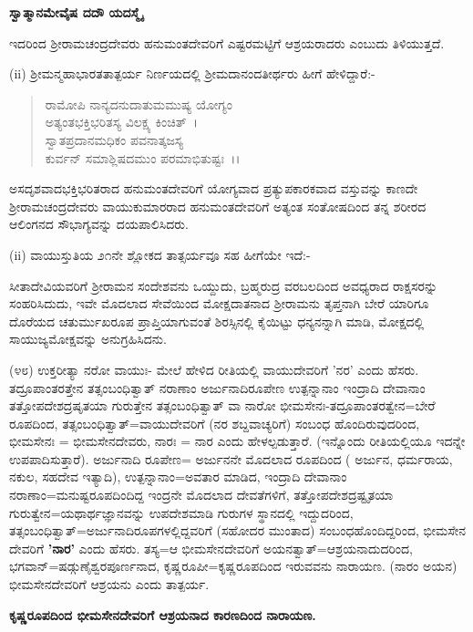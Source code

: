\begin{center}
\textbf{ಸ್ವಾತ್ಮಾನಮೇವೈಷ ದದೌ ಯದಸ್ಮೈ}
\end{center}

\noindent
ಇದರಿಂದ ಶ‍್ರೀರಾಮಚಂದ್ರದೇವರು ಹನುಮಂತದೇವರಿಗೆ ಎಷ್ಟರಮಟ್ಟಿಗೆ ಆಶ್ರಯರಾದರು ಎಂಬುದು ತಿಳಿಯುತ್ತದೆ.

(ii) ಶ‍್ರೀಮನ್ಮಹಾಭಾರತತಾತ್ಪರ್ಯ ನಿರ್ಣಯದಲ್ಲಿ ಶ‍್ರೀಮದಾನಂದತೀರ್ಥರು ಹೀಗೆ ಹೇಳಿದ್ದಾರೆ:-

\begin{verse}
ರಾಮೋಪಿ ನಾನ್ಯದನುದಾತುಮಮುಷ್ಯ ಯೋಗ್ಯಂ\\ ಅತ್ಯಂತಭಕ್ತಿಭರಿತಸ್ಯ ವಿಲಕ್ಷ್ಯ ಕಿಂಚಿತ್~।\\ ಸ್ವಾತಪ್ರದಾನಮಧಿಕಂ ಪವನಾತ್ಕಜಸ್ಯ\\ ಕುರ್ವನ್ ಸಮಾಶ್ಲಿಷದಮುಂ ಪರಮಾಭಿತುಷ್ಟಃ~।।
\end{verse}

\noindent
ಅಸದೃಶವಾದಭಕ್ತಿಭರಿತರಾದ ಹನುಮಂತದೇವರಿಗೆ ಯೋಗ್ಯವಾದ ಪ್ರತ್ಯುಪಕಾರಕವಾದ ವಸ್ತುವನ್ನು ಕಾಣದೇ ಶ‍್ರೀರಾಮಚಂದ್ರದೇವರು ವಾಯುಕುಮಾರರಾದ ಹನುಮಂತದೇವರಿಗೆ ಅತ್ಯಂತ ಸಂತೋಷದಿಂದ ತನ್ನ ಶರೀರದ ಆಲಿಂಗನದ ಸೌಭಾಗ್ಯವನ್ನು ದಯಪಾಲಿಸಿದರು.

(ii) ವಾಯುಸ್ತುತಿಯ ೨೧ನೇ ಶ್ಲೋಕದ ತಾತ್ಸರ್ಯವೂ ಸಹ ಹೀಗೆಯೇ ಇದೆ:-

ಸೀತಾದೇವಿಯವರಿಗೆ ಶ‍್ರೀರಾಮನ ಸಂದೇಶವನು ಒಯ್ದುದು, ಬ್ರಹ್ಮರುದ್ರ ವರಬಲದಿಂದ ಅವಧ್ಯರಾದ ರಾಕ್ಷಸರನ್ನು ಸಂಹರಿಸಿದುದು, ಇವೇ ಮೊದಲಾದ ಸೇವೆಯಿಂದ ಮೋಕ್ಷದಾತನಾದ ಶ‍್ರೀರಾಮನು ತೃಪ್ತನಾಗಿ ಬೇರೆ ಯಾರಿಗೂ ದೊರೆಯದ ಚತುರ್ಮುಖರೂಪ ಪ್ರಾಪ್ತಿಯಾಗುವಂತೆ ಶಿರಸ್ಸಿನಲ್ಲಿ ಕೈಯಿಟ್ಟು ಧನ್ಯನನ್ನಾಗಿ ಮಾಡಿ, ಮೋಕ್ಷದಲ್ಲಿ ಸಾಯುಜ್ಯಮೋಕ್ಷವನ್ನು ಅನುಗ್ರಹಿಸಿದನು.

(೪೮) ಉಕ್ತರೀತ್ಯಾ ನರೋ ವಾಯುಃ- ಮೇಲೆ ಹೇಳಿದ ರೀತಿಯಲ್ಲಿ ವಾಯುದೇವರಿಗೆ 'ನರ' ಎಂದು ಹೆಸರು. ತದ್ರೂಪಾಂತರತ್ತೇನ ತತ್ಸಂಬಂಧಿತ್ವಾತ್ ನರಾಣಾಂ ಅರ್ಜುನಾದಿರೂಪೇಣ ಉತ್ಪನ್ನಾನಾಂ ಇಂದ್ರಾದಿ ದೇವಾನಾಂ ತತ್ತೋಪದೇಶದ್ರಷೃತಯಾ ಗುರುತ್ತೇನ ತತ್ಸಂಬಂಧಿತ್ವಾತ್ ವಾ ನಾರೋ ಭೀಮಸೇನಃ-ತದ್ರೂಪಾಂತರತ್ವೇನ=ಬೇರೆ ರೂಪದಿಂದ, ತತ್ಸಂಬಂಧಿತ್ವಾತ್=ವಾಯುದೇವರಿಗೆ (ನರ ಶಬ್ದವಾಚ್ಯರಿಗೆ) ಸಂಬಂಧ ಹೊಂದಿರುವುದರಿಂದ, ಭೀಮಸೇನಃ = ಭೀಮಸೇನದೇವರು, ನಾರಃ = ನಾರ ಎಂದು ಹೇಳಲ್ಪಡುತ್ತಾರೆ. (ಇನ್ನೊಂದು ರೀತಿಯಲ್ಲಿಯೂ ಇದನ್ನೇ ಉಪಪಾದಿಸುತ್ತಾರೆ). ಅರ್ಜುನಾದಿ ರೂಪೇಣ= ಅರ್ಜುನನೇ ಮೊದಲಾದ ರೂಪದಿಂದ ( ಅರ್ಜುನ, ಧರ್ಮರಾಯ, ನಕುಲ, ಸಹದೇವ ಇತ್ಯಾದಿ), ಉತ್ಪನ್ನಾನಾಂ=ಅವತಾರ ಮಾಡಿದ, ಇಂದ್ರಾದಿ ದೇವಾನಾಂ ನರಾಣಾಂ=ಮನುಷ್ಟರೂಪದಿಂದಿದ್ದ ಇಂದ್ರನೇ ಮೊದಲಾದ ದೇವತೆಗಳಿಗೆ, ತತ್ತೋಪದೇಶದ್ರಷ್ಟೃತಯಾ ಗುರುತ್ವೇನ=ಯಥಾರ್ಥಜ್ಞಾನವನ್ನು ಉಪದೇಶಮಾಡಿ ಗುರುಗಳ ಸ್ಥಾನದಲ್ಲಿ ಇದ್ದುದರಿಂದ, ತತ್ಸಂಬಂಧಿತ್ವಾತ್=ಅರ್ಜುನಾದಿರೂಪಗಳಲ್ಲಿದ್ದವರಿಗೆ (ಸಹೋದರ ಮುಂತಾದ) ಸಂಬಂಧಹೊಂದಿದ್ದರಿಂದ, ಭೀಮಸೇನ ದೇವರಿಗೆ \textbf{'ನಾರ'} ಎಂದು ಹೆಸರು. ತಸ್ಯ=ಆ ಭೀಮಸೇನದೇವರಿಗೆ ಅಯನತ್ವಾತ್=ಆಶ್ರಯನಾದುದರಿಂದ, ಭಗವಾನ್=ಷಡ್ಗುಣೈಶ್ವರಪೂರ್ಣನಾದ, ಕೃಷ್ಣರೂಪೀ=ಕೃಷ್ಣರೂಪದಿಂದ ಇರುವವನು ನಾರಾಯಣ. (ನಾರಂ ಅಯನ) ಭೀಮಸೇನದೇವರಿಗೆ ಆಶ್ರಯನು ಎಂದು ತಾತ್ಪರ್ಯ.

\begin{center}
\textbf{ಕೃಷ್ಣರೂಪದಿಂದ ಭೀಮಸೇನದೇವರಿಗೆ ಆಶ್ರಯನಾದ ಕಾರಣದಿಂದ ನಾರಾಯಣ.}
\end{center}

